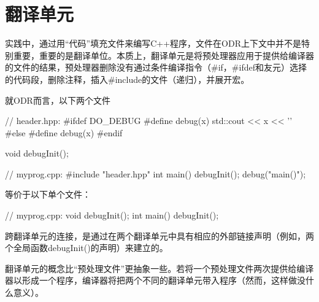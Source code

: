 \section{翻译单元}
实践中，通过用“代码”填充文件来编写C++程序，文件在ODR上下文中并不是特别重要，重要的是翻译单位。本质上，翻译单元是将预处理器应用于提供给编译器的文件的结果，预处理器删除没有通过条件编译指令（\#if，\#ifdef和友元）选择的代码段，删除注释，插入\#include的文件（递归），并展开宏。

就ODR而言，以下两个文件

\begin{cpp}
// header.hpp:
#ifdef DO_DEBUG
#define debug(x) std::cout << x << '\n'
#else
#define debug(x)
#endif

void debugInit();

// myprog.cpp:
#include "header.hpp"
int main()
{
	debugInit();
	debug("main()");
}
\end{cpp}

等价于以下单个文件：

\begin{cpp}
// myprog.cpp:
void debugInit();
int main()
{
	debugInit();
}
\end{cpp}

跨翻译单元的连接，是通过在两个翻译单元中具有相应的外部链接声明（例如，两个全局函数debugInit()的声明）来建立的。

翻译单元的概念比“预处理文件”更抽象一些。若将一个预处理文件两次提供给编译器以形成一个程序，编译器将把两个不同的翻译单元带入程序（然而，这样做没什么意义）。









































